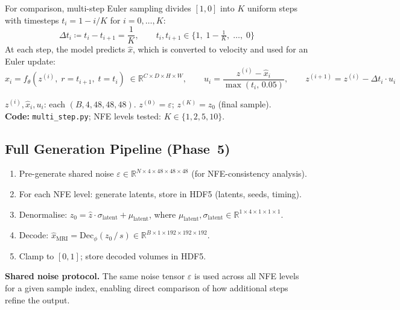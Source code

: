 \documentclass[11pt,a4paper]{article}
\newcommand{\code}[1]{\texttt{#1}}
\begin{document}
For comparison, multi-step Euler sampling divides $[1,0]$ into $K$ uniform
steps with timesteps $t_i = 1 - i/K$ for $i = 0, \ldots, K$:
\begin{equation}
  \Delta t_i \coloneqq t_i - t_{i+1} = \frac{1}{K},
  \qquad
  t_i, t_{i+1} \in \{1,\;1{-}\tfrac{1}{K},\;\ldots,\;0\}
  \label{eq:euler_times}
\end{equation}
At each step, the model predicts $\hat{x}$, which is converted to velocity
and used for an Euler update:
\begin{equation}
  \hat{x}_i = f_\theta(z^{(i)},\;r{=}t_{i+1},\;t{=}t_i)
    \;\in \mathbb{R}^{C \times D \times H \times W},
  \qquad
  u_i = \frac{z^{(i)}-\hat{x}_i}{\max(t_i,\,0.05)},
  \qquad
  z^{(i+1)} = z^{(i)} - \Delta t_i \cdot u_i
  \label{eq:euler_step}
\end{equation}
\begin{shapes}
$z^{(i)}, \hat{x}_i, u_i$: each $(B, 4, 48, 48, 48)$.
\quad $z^{(0)} = \varepsilon$; $z^{(K)} = z_0$ (final sample).\\
\textbf{Code:} \code{multi\_step.py}; NFE levels tested: $K \in \{1,2,5,10\}$.
\end{shapes}

\subsection{Full Generation Pipeline (Phase~5)}

\begin{enumerate}[nosep]
  \item Pre-generate shared noise $\varepsilon \in \mathbb{R}^{N \times 4 \times 48 \times 48 \times 48}$ (for NFE-consistency analysis).
  \item For each NFE level: generate latents, store in HDF5 (latents, seeds,
        timing).
  \item Denormalise: $z_0 = \hat{z}\cdot\sigma_{\mathrm{latent}}
                           + \mu_{\mathrm{latent}}$,
    where $\mu_\mathrm{latent}, \sigma_\mathrm{latent} \in \mathbb{R}^{1 \times 4 \times 1 \times 1 \times 1}$.
  \item Decode: $\hat{x}_\mathrm{MRI} = \mathrm{Dec}_\phi(z_0\,/\,s)
    \in \mathbb{R}^{B \times 1 \times 192 \times 192 \times 192}$.
  \item Clamp to $[0,1]$; store decoded volumes in HDF5.
\end{enumerate}

\textbf{Shared noise protocol.}  The same noise tensor $\varepsilon$ is used
across all NFE levels for a given sample index, enabling direct comparison of
how additional steps refine the output.
\end{document}
